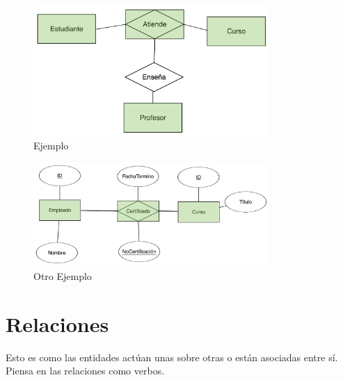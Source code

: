 \documentclass[12pt, fleqn]{report}                             %
\begin{document}
\begin{itemize}
                    \begin{figure}[h]
                        \centering
                        \includegraphics[width=0.80\textwidth]{EjemploEntidadAsociativa}
                        \caption{Ejemplo}
                    \end{figure}

                    \vspace{5em}

                    \begin{figure}[h]
                        \centering
                        \includegraphics[width=0.80\textwidth]{EjemploEntidadAsociativa2}
                        \caption{Otro Ejemplo}
                    \end{figure}
            \end{itemize}



        \clearpage
        \section{Relaciones}
                
            Esto es como las entidades actúan unas sobre otras o están asociadas entre sí.
            Piensa en las relaciones como verbos.
\end{document}
